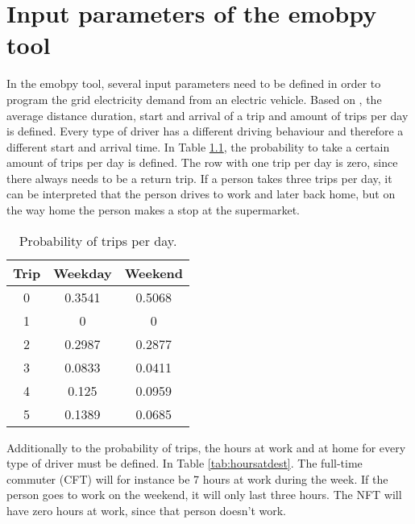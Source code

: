 \cleardoublepage
\setcounter{table}{0}
\renewcommand{\thetable}{A\arabic{table}}
\setcounter{figure}{0}
\renewcommand{\thefigure}{C\arabic{figure}}
\FloatBarrier

\chapter{Input parameters of the emobpy tool}
\label{sec:inputemobpy}

In the emobpy tool, several input parameters need to be defined in order to program the grid electricity demand from an electric vehicle. Based on \cite{mid}, the average distance duration, start and arrival of a trip and amount of trips per day is defined. Every type of driver has a different driving behaviour and therefore a different start and arrival time. In Table \ref{tab:tripsperday}, the probability to take a certain amount of trips per day is defined. The row with one trip per day is zero, since there always needs to be a return trip. If a person takes three trips per day, it can be interpreted that the person drives to work and later back home, but on the way home the person makes a stop at the supermarket. 


\begin{table}[!ht]
    \centering
    \caption{Probability of trips per day.}
    \begin{tabular}{ccc}

      Trip & Weekday & Weekend \\ \hline
        0 & 0.3541 & 0.5068 \\
        1 & 0 & 0 \\ 
        2 & 0.2987 & 0.2877 \\
        3 & 0.0833 & 0.0411 \\ 
        4 & 0.125 & 0.0959 \\
        5 & 0.1389 & 0.0685 \\ \hline
    \end{tabular}
    \label{tab:tripsperday}
\end{table}

Additionally to the probability of trips, the hours at work and at home for every type of driver must be defined. In Table \ref{tab:hoursatdest}. The full-time commuter (CFT) will for instance be 7 hours at work during the week. If the person goes to work on the weekend, it will only last three hours. The NFT will have zero hours at work, since that person doesn't work.

